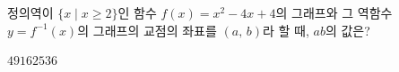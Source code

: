 정의역이 $\{x \mid x\ge 2\}$인 함수 $f(x)=x^2-4x+4$의 그래프와 그 역함수 $y=f^{-1}(x)$의 그래프의 교점의 좌표를 $(a,\,b)$라 할 때, $ab$의 값은?
\begin{choices32}{$4$}{$9$}{$16$}{$25$}{$36$}\end{choices32}
